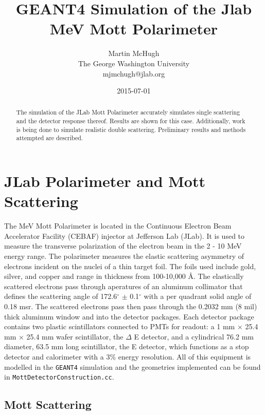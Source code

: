 \documentclass[11pt]{article}
\title{\textbf{GEANT4 Simulation of the Jlab MeV Mott Polarimeter}}
\author{Martin McHugh\\
		The George Washington University\\
		mjmchugh@jlab.org}
\date{2015-07-01}
\begin{document}
\maketitle

\begin{abstract}
The simulation of the JLab Mott Polarimeter accurately simulates single scattering and the detector response thereof. Results are shown for this case. Additionally, work is being done to simulate realistic double scattering. Preliminary results and methods attempted are described. 
\end{abstract}

\section{JLab Polarimeter and Mott Scattering}

The MeV Mott Polarimeter is located in the Continuous Electron Beam Accelerator Facility (CEBAF) injector at Jefferson Lab (JLab). It is used to measure the transverse polarization of the electron beam in the 2 - 10 MeV energy range. The polarimeter measures the elastic scattering asymmetry of electrons incident on the nuclei of a thin target foil. The foils used include gold, silver, and copper and range in thickness from 100-10,000 \AA. The elastically scattered electrons pass through aperatures of an aluminum collimator that defines the scattering angle of 172.6$^\circ$ $ \pm$ 0.1$^\circ$ with a per quadrant solid angle of 0.18 msr. The scattered electrons pass then pass through the 0.2032 mm (8 mil) thick aluminum window and into the detector packages. Each detector package contains two plastic scintillators connected to PMTs for readout: a 1 mm $\times$ 25.4 mm $\times$ 25.4 mm wafer scintillator, the $\Delta$ E detector, and a cylindrical 76.2 mm diameter, 63.5 mm long scintillator, the E detector, which functions as a stop detector and calorimeter with a 3\% energy resolution. All of this equipment is modelled in the \texttt{GEANT4} simulation and the geometries implemented can be found in \texttt{MottDetectorConstruction.cc}.

\subsection{Mott Scattering}
\end{document}
